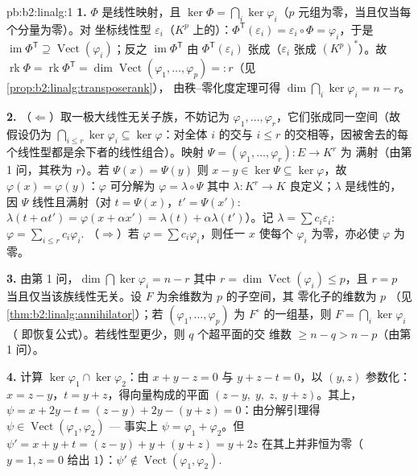 \begin{solution}{pb:b2:linalg:1}
\textbf{1.} $\Phi$ 是线性映射，且 $\ker\Phi = \bigcap_i
\ker\varphi_i$（$p$ 元组为零，当且仅当每个分量为零）。对
坐标线性型 $\varepsilon_i$（$K^p$ 上的）：$\Phi^{\mathsf
T}(\varepsilon_i) = \varepsilon_i \circ \Phi = \varphi_i$，于是
$\operatorname{im}\Phi^{\mathsf T} \supseteq
\operatorname{Vect}(\varphi_i)$；反之
$\operatorname{im}\Phi^{\mathsf T}$ 由
$\Phi^{\mathsf T}(\varepsilon_i)$ 张成（$\varepsilon_i$ 张成
$(K^p)^*$）。故 $\operatorname{rk}\Phi = \operatorname{rk}
\Phi^{\mathsf T} = \dim\operatorname{Vect}(\varphi_1, \dots,
\varphi_p) =: r$（见\cref{prop:b2:linalg:transposerank}），
由秩--零化度定理可得 $\dim\bigcap_i\ker\varphi_i = n - r$。

\textbf{2.} （$\Leftarrow$）取一极大线性无关子族，不妨记为
$\varphi_1, \dots, \varphi_r$，它们张成同一空间（故
假设仍为 $\bigcap_{i \leq r}\ker\varphi_i \subseteq
\ker\varphi$：对全体 $i$ 的交与
$i \leq r$ 的交相等，因被舍去的每个线性型都是余下者的线性组合）。映射
$\Psi = (\varphi_1, \dots, \varphi_r) \colon E \to K^r$ 为
满射（由第 1 问，其秩为 $r$）。若 $\Psi(x) = \Psi(y)$
则 $x - y \in \ker\Psi \subseteq \ker\varphi$，故 $\varphi(x) =
\varphi(y)$：$\varphi$ 可分解为 $\varphi = \lambda \circ \Psi$
其中 $\lambda \colon K^r \to K$ 良定义；$\lambda$ 是线性的，
因 $\Psi$ 线性且满射（对 $t = \Psi(x)$，$t' =
\Psi(x')$: $\lambda(t + \alpha t') = \varphi(x + \alpha x') =
\lambda(t) + \alpha\lambda(t')$）。记 $\lambda = \sum c_i
\varepsilon_i$: $\varphi = \sum_{i \leq r} c_i\varphi_i$.
（$\Rightarrow$）若 $\varphi = \sum c_i \varphi_i$，则任一 $x$
使每个 $\varphi_i$ 为零，亦必使 $\varphi$ 为零。

\textbf{3.} 由第 1 问，$\dim\bigcap\ker\varphi_i = n - r$
其中 $r = \dim\operatorname{Vect}(\varphi_i) \leq p$，且 $r = p$
当且仅当该族线性无关。设 $F$ 为余维数为 $p$ 的子空间，其
零化子的维数为 $p$
（见\cref{thm:b2:linalg:annihilator}）；若 $(\varphi_1, \dots,
\varphi_p)$ 为 $F^\circ$ 的一组基，则 $F = \bigcap_i\ker\varphi_i$（
即恢复公式）。若线性型更少，则 $q$ 个超平面的交
维数 $\geq n - q > n - p$（由第 1 问）。

\textbf{4.} 计算 $\ker\varphi_1 \cap \ker\varphi_2$：由 $x
+ y - z = 0$ 与 $y + z - t = 0$，以 $(y, z)$ 参数化：$x = z
- y$，$t = y + z$，得向量构成的平面 $(z - y,\; y,\;
z,\; y + z)$。其上，$\psi = x + 2y - t = (z - y) + 2y - (y + z)
= 0$：由分解引理得 $\psi \in
\operatorname{Vect}(\varphi_1, \varphi_2)$ --- 事实上 $\psi =
\varphi_1 + \varphi_2$。但 $\psi' = x + y + t = (z - y) + y +
(y + z) = y + 2z$ 在其上并非恒为零（$y = 1, z = 0$
给出 $1$）：$\psi' \notin \operatorname{Vect}(\varphi_1,
\varphi_2)$.


\end{solution}
